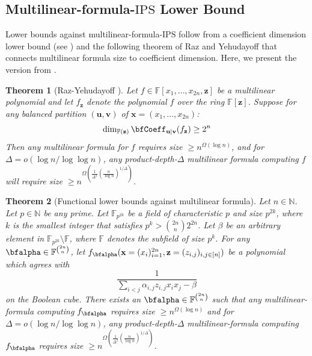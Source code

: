 \documentclass[11pt]{article}
\newtheorem{theorem}{Theorem}[section]
\newcommand{\F}{\mathbb{F}}
\newcommand{\comment}[2]{\marginpar{\tiny{\textbf{#1: }\textit{#2}}}}
\newcommand{\ssr}[1]{\comment{SS}{#1}}
\newcommand{\IPS}{\mathrm{IPS}}
\begin{document}
\subsection{Multilinear-formula-$\IPS$ Lower Bound}

Lower bounds against multilinear-formula-$\IPS$ follow from a coefficient dimension lower bound (see ) and the following theorem of Raz and Yehudayoff that connects multilinear formula size to coefficient dimension. Here, we present the version from \cite[Theorem 3.13]{FSTW21}.

\begin{theorem}[Raz-Yehudayoff \cite{RY09}\cite{Raz-2009}]
    Let $f \in \F[x_1, \dots, x_{2n}, \mathbf{z}]$ be a multilinear polynomial and let $f_{\mathbf{z}}$ denote the polynomial $f$ over the ring $\F[\mathbf{z}]$. Suppose for any balanced partition $(\mathbf{u}, \mathbf{v})$ of $\mathbf{x} = (x_1, \dots, x_{2n})$: $$\dim_{\F(\mathbf{z})} \bfCoeff_{\mathbf{u} | \mathbf{v}}(f_\mathbf{z}) \geq 2^n$$
    Then any multilinear formula for $f$ requires size $\geq n^{\Omega(\log n)}$, and for $\Delta = o(\log n / \log \log n)$, any product-depth-$\Delta$ multilinear formula computing $f$ will require size $\geq n^{\Omega\left(\frac{1}{\Delta^2}(\frac{n}{\log n})^{1/\Delta}\right )}$. 
\end{theorem}
\begin{theorem}[Functional lower bounds against multilinear formula]\label{thm:multilinear-formula-lbds-via-raz-yehudayoff}
    Let $n\in \mathbb{N}$. Let $p\in \mathbb{N}$ be any prime. Let $\F_{p^{2k}}$ be a field of characteristic $p$ and size $p^{2k}$, where $k$ is the smallest integer that satisfies $p^k > \binom{2n}{n}2^{2n}$. Let $\beta$ be an arbitrary element in $\F_{p^{2k}}\setminus\F$, where $\F$ denotes the subfield of size $p^k$. For any $\bfalpha \in \F^{\binom{2n}{n}}$, let $f_{\bfalpha}(\mathbf{x}=(x_i)_{i=1}^{2n},\mathbf{z}=(z_{i,j})_{i,j\in[n]})$ be a polynomial which agrees with $$\frac{1}{\sum_{i<j}\alpha_{i,j}z_{i,j}x_ix_j - \beta}$$ on the Boolean cube. There exists an $\bfalpha \in \F^{\binom{2n}{n}}$ such that any multilinear-formula computing $f_{\bfalpha}$ requires size $\geq n^{\Omega(\log n)}$ and for $\Delta = o(\log n / \log \log n)$, any product-depth-$\Delta$ multilinear-formula computing $f_{\bfalpha}$ requires size $\geq n^{\Omega\left(\frac{1}{\Delta^2}(\frac{n}{\log n})^{1/\Delta}\right )}$. 
\end{theorem}
\end{document}
